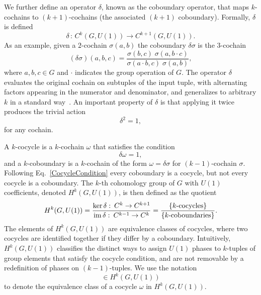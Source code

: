 \documentclass[12pt,a4paper]{article}
\begin{document}
We further define an operator $\delta$, known as the coboundary operator, that  maps $k$-cochains to $(k+1)$-cochains (the associated $(k+1)$ coboundary). Formally, $\delta$ is defined
%
\begin{equation}\label{CoboundaryMap}
\delta\,\colon\, C^k(G, U(1)) \to C^{k+1}(G, U(1)).
\end{equation}
%
As an example, given a $2$-cochain $\sigma(a, b)$ the coboundary $\delta\sigma$ is the $3$-cochain
%
\begin{equation}\label{CoboundaryExample}
(\delta\sigma)(a, b, c) = \frac{\sigma(b, c)\;\sigma(a, b \cdot c)}{\sigma(a \cdot b, c)\;\sigma(a, b)},
\end{equation}
%
where $a, b, c \in G$ and $\cdot$ indicates the group operation of $G$. The operator $\delta$ evaluates the original cochain on subtuples of the input tuple, with alternating factors appearing in the numerator and denominator, and generalizes to arbitrary $k$ in a standard way~\cite{Dijkgraaf:1990}. An important property of $\delta$ is that applying it twice produces the trivial action
%
\begin{equation}\label{DeltaSquared}
\delta^2 = 1,
\end{equation}
%
for any cochain.

A $k$-cocycle is a $k$-cochain $\omega$ that satisfies the condition
%
\begin{equation}\label{CocycleCondition}
    \delta\omega = 1,
\end{equation}
%
and a $k$-coboundary is a $k$-cochain of the form $\omega = \delta\sigma$ for $(k-1)$-cochain $\sigma$. Following Eq.\ \eqref{CocycleCondition} every coboundary is a cocycle, but not every cocycle is a coboundary. The $k$-th cohomology group of $G$ with $U(1)$ coefficients, denoted $H^k(G, U(1))$, is then defined as the quotient
%
\begin{equation}\label{CohomologyGroup}
H^k(G, U(1)) = \frac{\ker\delta\,\colon\, C^k \to C^{k+1}}{\mathrm{im}\,\delta\,\colon\, C^{k-1} \to C^k} = \frac{\{k\textnormal{-cocycles}\}}{\{k\textnormal{-coboundaries}\}}.
\end{equation}
%
The elements of $H^k(G, U(1))$ are equivalence classes of cocycles, where two cocycles are identified together if they differ by a coboundary. Intuitively, $H^k(G, U(1))$ classifies the distinct ways to assign $U(1)$ phases to $k$-tuples of group elements that satisfy the cocycle condition, and are not removable by a redefinition of phases on $(k-1)$-tuples. We use the notation
%
\begin{equation}
    [\omega] \in H^k(G, U(1))
\end{equation}
%
to denote the equivalence class of a cocycle $\omega$ in $H^k(G, U(1))$. 
\end{document}
